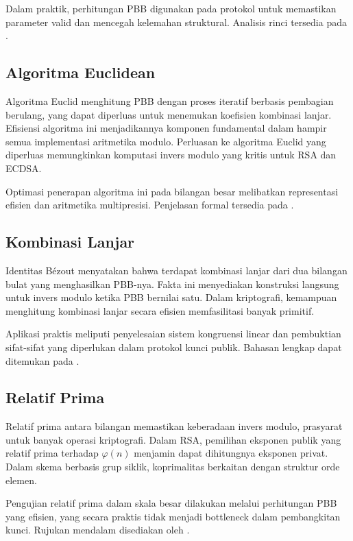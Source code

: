 \documentclass[../main.tex]{subfiles}
\begin{document}
Dalam praktik, perhitungan PBB digunakan pada protokol untuk memastikan parameter valid dan mencegah kelemahan struktural. Analisis rinci tersedia pada \textcite{menezes1996handbook}.

\subsection{Algoritma Euclidean}
Algoritma Euclid menghitung PBB dengan proses iteratif berbasis pembagian berulang, yang dapat diperluas untuk menemukan koefisien kombinasi lanjar. Efisiensi algoritma ini menjadikannya komponen fundamental dalam hampir semua implementasi aritmetika modulo. Perluasan ke algoritma Euclid yang diperluas memungkinkan komputasi invers modulo yang kritis untuk RSA dan ECDSA.

Optimasi penerapan algoritma ini pada bilangan besar melibatkan representasi efisien dan aritmetika multipresisi. Penjelasan formal tersedia pada \textcite{menezes1996handbook}.

\subsection{Kombinasi Lanjar}
Identitas Bézout menyatakan bahwa terdapat kombinasi lanjar dari dua bilangan bulat yang menghasilkan PBB-nya. Fakta ini menyediakan konstruksi langsung untuk invers modulo ketika PBB bernilai satu. Dalam kriptografi, kemampuan menghitung kombinasi lanjar secara efisien memfasilitasi banyak primitif.

Aplikasi praktis meliputi penyelesaian sistem kongruensi linear dan pembuktian sifat-sifat yang diperlukan dalam protokol kunci publik. Bahasan lengkap dapat ditemukan pada \textcite{menezes1996handbook}.

\subsection{Relatif Prima}
Relatif prima antara bilangan memastikan keberadaan invers modulo, prasyarat untuk banyak operasi kriptografi. Dalam RSA, pemilihan eksponen publik yang relatif prima terhadap \(\varphi(n)\) menjamin dapat dihitungnya eksponen privat. Dalam skema berbasis grup siklik, koprimalitas berkaitan dengan struktur orde elemen.

Pengujian relatif prima dalam skala besar dilakukan melalui perhitungan PBB yang efisien, yang secara praktis tidak menjadi bottleneck dalam pembangkitan kunci. Rujukan mendalam disediakan oleh \textcite{menezes1996handbook}.
\end{document}
